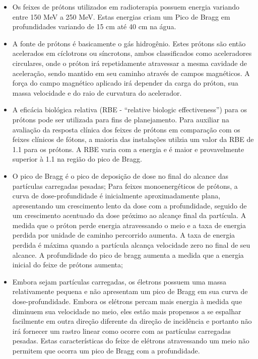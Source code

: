 \documentclass[11pt,a4paper]{article}
\newcounter{exemplo}
\begin{document}
\begin{exemplo}
\begin{itemize}
        \item Os feixes de prótons utilizados em radioterapia possuem energia variando entre 150 MeV a 250 MeV. Estas energias criam um Pico de Bragg em profundidades variando de 15 cm até 40 cm na água.
        
        \item A fonte de prótons é basicamente o gás hidrogênio. Estes prótons são então acelerados em cíclotrons ou síncrotons, ambos classificados como aceleradores circulares, onde o próton irá repetidamente atravessar a mesma cavidade de aceleração, sendo mantido em seu caminho através de campos magnéticos. A força do campo magnético aplicado irá depender da carga do próton, sua massa velocidade e do raio de curvatura do acelerador. 
        
        \item A eficácia biológica relativa (RBE - ``relative biologic effectiveness'') para os prótons pode ser utilizada para fins de planejamento. Para auxiliar na avaliação da resposta clínica dos feixes de prótons em comparação com os feixes clínicos de fótons, a maioria das instalações utilzia um valor da RBE de 1.1 para os prótons. A RBE varia com a energia e é maior e provavelmente superior à 1.1 na região do pico de Bragg.
        
        \item O pico de Bragg é o pico de deposição de dose no final do alcance das partículas carregadas pesadas; Para feixes monoenergéticos de prótons, a curva de dose-profundidade é inicialmente aproximadamente plana, apresentando um crescimento lento da dose com a profundidade,  seguido de um crescimento acentuado da dose próximo ao alcançe final da partícula. A medida que o próton perde energia atravessando o meio e a taxa de energia perdida por unidade de caminho percorrido aumenta. A taxa de energia perdida é máxima quando a partícula alcança velocidade zero no final de seu alcance. A profundidade do pico de bragg aumenta a medida que a energia inicial do feixe de prótons aumenta;
        
        \item Embora sejam partículas carregadas, os életrons possuem uma massa relativamente pequena e não apresentam um pico de Bragg em sua curva de dose-profundidade. Embora os elétrons percam mais energia à medida que diminuem sua velocidade no meio, eles estão mais propensos a se espalhar facilmente em outra direção diferente da direção de incidência e portanto não irá fornecer um rastro linear como ocorre com as partículas carregadas pesadas. Estas características do feixe de elétrons atravessando um meio não permitem que ocorra um pico de Bragg com a profundidade.
        

\end{itemize}
\end{exemplo}
\end{document}

